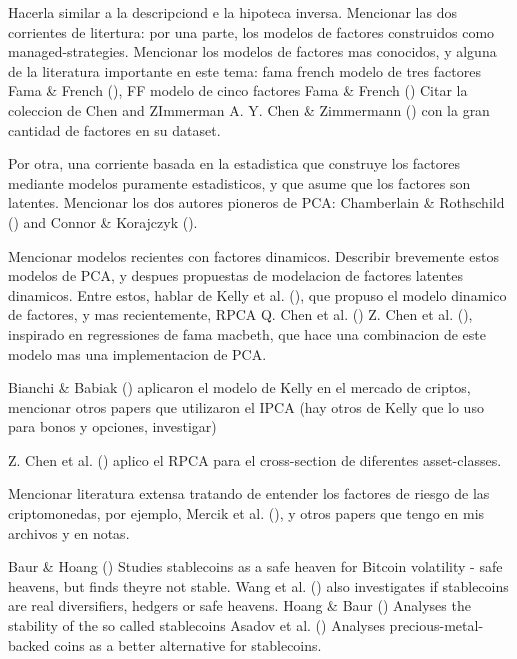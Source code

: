 \documentclass[
  12pt,
  a4paper,
  openany]{scrbook}
\begin{document}
Hacerla similar a la descripciond e la hipoteca inversa. Mencionar las
dos corrientes de litertura: por una parte, los modelos de factores
construidos como managed-strategies. Mencionar los modelos de factores
mas conocidos, y alguna de la literatura importante en este tema: fama
french modelo de tres factores Fama \& French
(), FF modelo de cinco factores
Fama \& French () Citar la
coleccion de Chen and ZImmerman A. Y. Chen \& Zimmermann
() con la gran cantidad de
factores en su dataset.

Por otra, una corriente basada en la estadistica que construye los
factores mediante modelos puramente estadisticos, y que asume que los
factores son latentes. Mencionar los dos autores pioneros de PCA:
Chamberlain \& Rothschild
() and Connor \&
Korajczyk ().

Mencionar modelos recientes con factores dinamicos. Describir brevemente
estos modelos de PCA, y despues propuestas de modelacion de factores
latentes dinamicos. Entre estos, hablar de Kelly et al.
(), que propuso el
modelo dinamico de factores, y mas recientemente, RPCA Q. Chen et al.
() Z. Chen et al.
(), inspirado en regressiones de
fama macbeth, que hace una combinacion de este modelo mas una
implementacion de PCA.

Bianchi \& Babiak
() aplicaron
el modelo de Kelly en el mercado de criptos, mencionar otros papers que
utilizaron el IPCA (hay otros de Kelly que lo uso para bonos y opciones,
investigar)

Z. Chen et al. () aplico el RPCA
para el cross-section de diferentes asset-classes.

Mencionar literatura extensa tratando de entender los factores de riesgo
de las criptomonedas, por ejemplo, Mercik et al.
(),
y otros papers que tengo en mis archivos y en notas.

Baur \& Hoang () Studies
stablecoins as a safe heaven for Bitcoin volatility - safe heavens, but
finds theyre not stable. Wang et al.
() also investigates if
stablecoins are real diversifiers, hedgers or safe heavens. Hoang \&
Baur () Analyses the stability of
the so called stablecoins Asadov et al.
() Analyses
precious-metal-backed coins as a better alternative for stablecoins.
\end{document}
